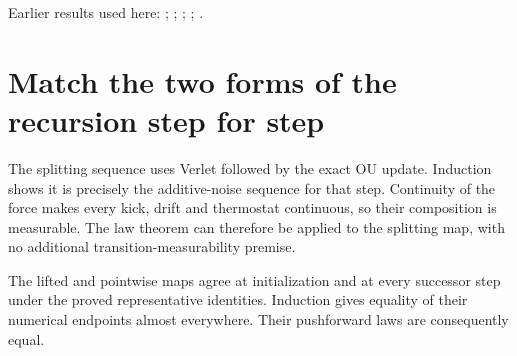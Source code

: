 \documentclass[11pt,a4paper]{article}
\begin{document}
Earlier results used here: \cite[Section~3.20.1]{LangevinLean2026ULASC}; \cite[Section~3.20.4]{LangevinLean2026ULASC}; \cite[Section~3.20.5]{LangevinLean2026ULASC}; \cite[Section~3.33.6]{LangevinLean2026ULASC}; \cite[Section~3.33.9]{LangevinLean2026ULASC}.

\section{\texorpdfstring{Match the two forms of the recursion step for step}{Match the two forms of the recursion step for step}}


The splitting sequence uses Verlet followed by the exact OU update. Induction shows it is precisely the additive-noise sequence for that step. Continuity of the force makes every kick, drift and thermostat continuous, so their composition is measurable. The law theorem can therefore be applied to the splitting map, with no additional transition-measurability premise.



The lifted and pointwise maps agree at initialization and at every successor step under the proved representative identities. Induction gives equality of their numerical endpoints almost everywhere. Their pushforward laws are consequently equal.
\end{document}
